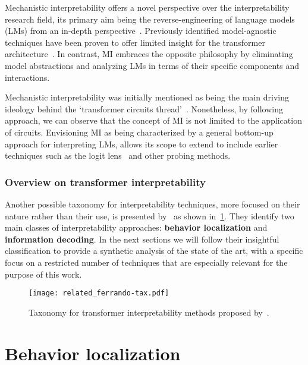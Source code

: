 Mechanistic interpretability offers a novel perspective over the interpretability research field, its primary aim being the reverse-engineering of language models (LMs) from an in-depth perspective~\cite{olah2022}.
Previously identified model-agnostic techniques have been proven to offer limited insight for the transformer architecture~\cite{neely2022,pruthi2022,bibal2022,krishna2024}.
In contrast, MI embraces the opposite philosophy by eliminating model abstractions and analyzing LMs in terms of their specific components and interactions.

Mechanistic interpretability was initially mentioned as being the main driving ideology behind the `transformer circuits thread'~\cite{elhage2023}.
Nonetheless, by following~\citet{rai2024} approach, we can observe that the concept of MI is not limited to the application of circuits.
Envisioning MI as being characterized by a general bottom-up approach for interpreting LMs, allows its scope to extend to include earlier techniques such as the logit lens~\cite{nostalgebraist2020} and other probing methods.

\subsubsection*{Overview on transformer interpretability}

Another possible taxonomy for interpretability techniques, more focused on their nature rather than their use, is presented by~\citet{ferrando2024} as shown in~\cref{fig:related_ferrando-tax}.
They identify two main classes of interpretability approaches: \textbf{behavior localization} and \textbf{information decoding}.
In the next sections we will follow their insightful classification to provide a synthetic analysis of the state of the art, with a specific focus on a restricted number of techniques that are especially relevant for the purpose of this work.

\begin{figure}[t!]
    \centering
    \texttt{[image: related\_ferrando-tax.pdf]}
    \caption{Taxonomy for transformer interpretability methods proposed by~\citet{ferrando2024}.}
    \label{fig:related_ferrando-tax}
\end{figure}

\section{Behavior localization}

